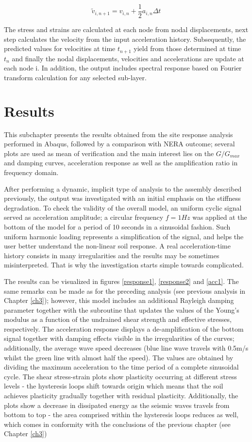 	\begin{equation}
	\tilde{v}_{i,n+1}=v_{i,n}+\frac{1}{2}a_{i,n}\Delta t
	\end{equation}
	
	The stress and strains are calculated at each node from nodal displacements, next step calculates the velocity from the input acceleration history. Subsequently, the predicted values for velocities at time $t_{n+1}$ yield from those determined at time $t_n$ and finally the nodal displacements, velocities and accelerations are update at each node i. In addition, the output includes spectral response based on Fourier transform calculation for any selected sub-layer.
	
	\section{Results}
	This subchapter presents the results obtained from the site response analysis performed in Abaqus, followed by a comparison with NERA outcome; several plots are used as mean of verification and the main interest lies on the $G/G_{max}$ and damping curves, acceleration response as well as the amplification ratio in frequency domain.
	
	After performing a dynamic, implicit type of analysis to the assembly described previously, the output was investigated with an initial emphasis on the stiffness degradation. To check the validity of the overall model, an uniform cyclic signal served as acceleration amplitude; a circular frequency $f=1 Hz$ was applied at the bottom of the model for a period of 10 seconds in a sinusoidal fashion. Such uniform harmonic loading represents a simplification of the signal, and helps the user better understand the non-linear soil response. A real acceleration-time history consists in many irregularities and the results may be sometimes misinterpreted. That is why the investigation starts simple towards complicated.
	
	The results can be visualized in figures \ref{response1}, \ref{response2} and \ref{acc1}. The same remarks can be made as for the preceding analysis (see previous analysis in Chapter \ref{ch3}); however, this model includes an additional Rayleigh damping parameter together with the subroutine that updates the values of the Young's modulus as a function of the undrained shear strength and effective stresses, respectively. The acceleration response displays a de-amplification of the bottom signal together with damping effects visible in the irregularities of the curves; additionally, the average wave speed decreases (blue line wave travels with 0.5m/s whilst the green line with almost half the speed). The values are obtained by dividing the maximum acceleration to the time period of a complete sinusoidal cycle. The shear stress-strain plots show plasticity occurring at different stress levels - the hysteresis loops shift towards origin which means that the soil achieves plasticity gradually together with residual plasticity. Additionally, the plots show a decrease in dissipated energy as the seismic waves travels from bottom to top - the area comprised within the hysteresis loops reduces as well, which comes in conformity with the conclusions of the previous chapter (see Chapter \ref{ch3})
	
